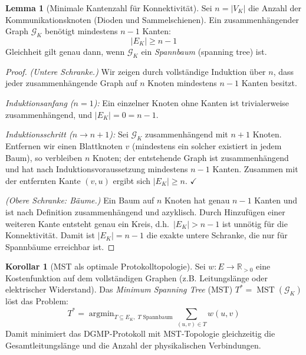 ﻿\documentclass[a4paper,12pt]{article}
\theoremstyle{definition}
\newtheorem{lemma}[definition]{Lemma}
\newtheorem{korollar}[definition]{Korollar}
\theoremstyle{remark}
\newcommand{\R}{\mathbb{R}}
\begin{document}
\begin{lemma}[Minimale Kantenzahl für Konnektivität]
\label{lem:komm_mst}
Sei $n = |V_K|$ die Anzahl der Kommunikationsknoten (Dioden und Sammelschienen).
Ein zusammenhängender Graph $\mathcal{G}_K$ benötigt mindestens $n-1$ Kanten:
\begin{equation}
  |E_K| \geq n - 1
  \label{eq:kantenmin}
\end{equation}
Gleichheit gilt genau dann, wenn $\mathcal{G}_K$ ein \emph{Spannbaum} (spanning tree) ist.
\end{lemma}

\begin{proof}
\emph{(Untere Schranke.)} Wir zeigen durch vollständige Induktion über $n$,
dass jeder zusammenhängende Graph auf $n$ Knoten mindestens $n-1$ Kanten besitzt.

\emph{Induktionsanfang ($n=1$):} Ein einzelner Knoten ohne Kanten ist
trivialerweise zusammenhängend, und $|E_K| = 0 = n - 1$.

\emph{Induktionsschritt ($n \to n+1$):} Sei $\mathcal{G}_K$ zusammenhängend mit
$n+1$ Knoten. Entfernen wir einen Blattknoten $v$ (mindestens ein solcher existiert
in jedem Baum), so verbleiben $n$ Knoten; der entstehende Graph ist zusammenhängend
und hat nach Induktionsvoraussetzung mindestens $n-1$ Kanten. Zusammen mit der
entfernten Kante $(v, u)$ ergibt sich $|E_K| \geq n$. $\checkmark$

\emph{(Obere Schranke: Bäume.)} Ein Baum auf $n$ Knoten hat genau $n-1$ Kanten
und ist nach Definition zusammenhängend und azyklisch. Durch Hinzufügen einer
weiteren Kante entsteht genau ein Kreis, d.h.~$|E_K| > n-1$ ist unnötig für
die Konnektivität. Damit ist $|E_K| = n-1$ die exakte untere Schranke, die nur
für Spannbäume erreichbar ist. \qedhere
\end{proof}

\begin{korollar}[MST als optimale Protokolltopologie]
\label{kor:mst_opt}
Sei $w: E \to \R_{>0}$ eine Kostenfunktion auf dem vollständigen Graphen
(z.B. Leitungslänge oder elektrischer Widerstand). Das
\emph{Minimum Spanning Tree} (MST) $T^* = \operatorname{MST}(\mathcal{G}_K)$
löst das Problem:
\begin{equation}
  T^* = \operatorname{argmin}_{T \subseteq E_K,\; T \text{ Spannbaum}}
        \sum_{(u,v) \in T} w(u,v)
  \label{eq:mst_problem}
\end{equation}
Damit minimiert das DGMP-Protokoll mit MST-Topologie gleichzeitig die
Gesamtleitungslänge und die Anzahl der physikalischen Verbindungen.
\end{korollar}
\end{document}
